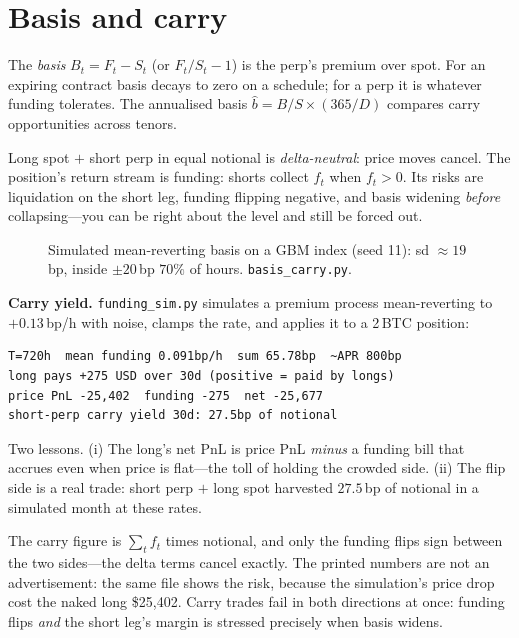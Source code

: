\section{Basis and carry}\label{sec:basis}

The \emph{basis} $B_t = F_t - S_t$ (or $F_t/S_t - 1$) is the perp's premium over spot. For an
expiring contract basis decays to zero on a schedule; for a perp it is whatever funding tolerates.
The annualised basis $\hat b = B/S \times (365/D)$ compares carry opportunities across tenors.

\begin{principle}
Long spot $+$ short perp in equal notional is \emph{delta-neutral}: price moves cancel. The
position's return stream is funding: shorts collect $f_t$ when $f_t>0$. Its risks are
liquidation on the short leg, funding flipping negative, and basis widening \emph{before}
collapsing---you can be right about the level and still be forced out.
\end{principle}

\begin{figure}[htbp]\centering

\caption{Simulated mean-reverting basis on a GBM index (seed 11): sd $\approx19$\,bp, inside
$\pm20$\,bp $70\%$ of hours. \texttt{basis\_carry.py}.}
\label{fig:basists}
\end{figure}

\begin{example}\label{ex:carry}
\textbf{Carry yield.} \texttt{funding\_sim.py} simulates a premium process mean-reverting to
$+0.13$\,bp/h with noise, clamps the rate, and applies it to a 2\,BTC position:
\begin{lstlisting}[numbers=none]
T=720h  mean funding 0.091bp/h  sum 65.78bp  ~APR 800bp
long pays +275 USD over 30d (positive = paid by longs)
price PnL -25,402  funding -275  net -25,677
short-perp carry yield 30d: 27.5bp of notional
\end{lstlisting}
Two lessons. (i) The long's net PnL is price PnL \emph{minus} a funding bill that accrues even
when price is flat---the toll of holding the crowded side. (ii) The flip side is a real trade:
short perp $+$ long spot harvested $27.5$\,bp of notional in a simulated month at these rates.
\begin{solution}
The carry figure is $\sum_t f_t$ times notional, and only the funding flips sign between the
two sides---the delta terms cancel exactly. The printed numbers are not an advertisement: the
same file shows the risk, because the simulation's price drop cost the naked long \$25{,}402.
Carry trades fail in both directions at once: funding flips \emph{and} the short leg's margin
is stressed precisely when basis widens.
\end{solution}
\end{example}

